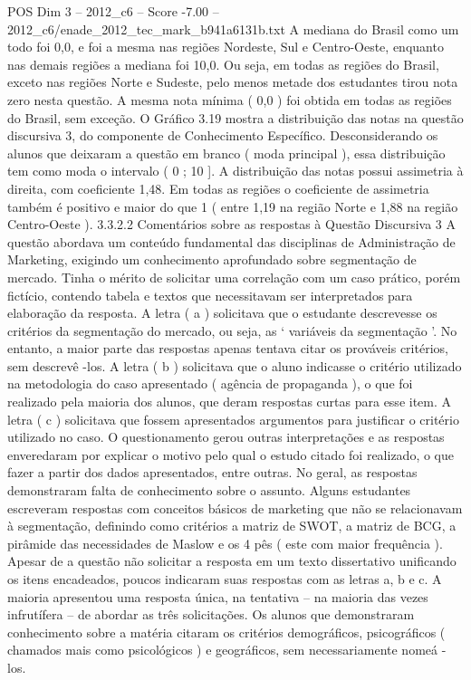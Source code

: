 \begin{textsample}{POS Dim 3 – 2012\_c6 – Score -7.00 – 2012\_c6/enade\_2012\_tec\_mark\_b941a6131b.txt}
A mediana do Brasil como um todo foi 0,0, e foi a mesma nas regiões Nordeste, Sul e Centro-Oeste, enquanto nas demais regiões a mediana foi 10,0.
Ou seja, em todas as regiões do Brasil, exceto nas regiões Norte e Sudeste, pelo menos metade dos estudantes tirou nota zero nesta questão.
A mesma nota mínima ( 0,0 ) foi obtida em todas as regiões do Brasil, sem exceção.
O Gráfico 3.19 mostra a distribuição das notas na questão discursiva 3, do componente de Conhecimento Específico.
Desconsiderando os alunos que deixaram a questão em branco ( moda principal ), essa distribuição tem como moda o intervalo ( 0 ; 10 ].
A distribuição das notas possui assimetria à direita, com coeficiente 1,48.
Em todas as regiões o coeficiente de assimetria também é positivo e maior do que 1 ( entre 1,19 na região Norte e 1,88 na região Centro-Oeste ). 3.3.2.2 Comentários sobre as respostas à Questão Discursiva 3 A questão abordava um conteúdo fundamental das disciplinas de Administração de Marketing, exigindo um conhecimento aprofundado sobre segmentação de mercado.
Tinha o mérito de solicitar uma correlação com um caso prático, porém fictício, contendo tabela e textos que necessitavam ser interpretados para elaboração da resposta.
A letra ( a ) solicitava que o estudante descrevesse os critérios da segmentação do mercado, ou seja, as ‘ variáveis da segmentação ’.
No entanto, a maior parte das respostas apenas tentava citar os prováveis critérios, sem descrevê -los.
A letra ( b ) solicitava que o aluno indicasse o critério utilizado na metodologia do caso apresentado ( agência de propaganda ), o que foi realizado pela maioria dos alunos, que deram respostas curtas para esse item.
A letra ( c ) solicitava que fossem apresentados argumentos para justificar o critério utilizado no caso.
O questionamento gerou outras interpretações e as respostas enveredaram por explicar o motivo pelo qual o estudo citado foi realizado, o que fazer a partir dos dados apresentados, entre outras.
No geral, as respostas demonstraram falta de conhecimento sobre o assunto.
Alguns estudantes escreveram respostas com conceitos básicos de marketing que não se relacionavam à segmentação, definindo como critérios a matriz de SWOT, a matriz de BCG, a pirâmide das necessidades de Maslow e os 4 pês ( este com maior frequência ).
Apesar de a questão não solicitar a resposta em um texto dissertativo unificando os itens encadeados, poucos indicaram suas respostas com as letras a, b e c.
A maioria apresentou uma resposta única, na tentativa – na maioria das vezes infrutífera – de abordar as três solicitações.
Os alunos que demonstraram conhecimento sobre a matéria citaram os critérios demográficos, psicográficos ( chamados mais como psicológicos ) e geográficos, sem necessariamente nomeá -los.

\end{textsample}
